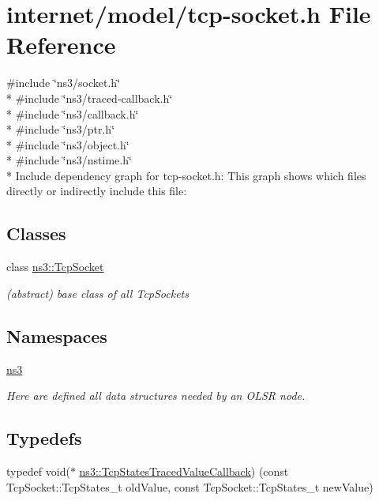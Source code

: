 \hypertarget{tcp-socket_8h}{}\section{internet/model/tcp-\/socket.h File Reference}
\label{tcp-socket_8h}
{\ttfamily \#include \char`\"{}ns3/socket.\+h\char`\"{}}\\*
{\ttfamily \#include \char`\"{}ns3/traced-\/callback.\+h\char`\"{}}\\*
{\ttfamily \#include \char`\"{}ns3/callback.\+h\char`\"{}}\\*
{\ttfamily \#include \char`\"{}ns3/ptr.\+h\char`\"{}}\\*
{\ttfamily \#include \char`\"{}ns3/object.\+h\char`\"{}}\\*
{\ttfamily \#include \char`\"{}ns3/nstime.\+h\char`\"{}}\\*
Include dependency graph for tcp-\/socket.h\+:
This graph shows which files directly or indirectly include this file\+:
\subsection*{Classes}
\begin{DoxyCompactItemize}
\item 
class \hyperlink{classns3_1_1TcpSocket}{ns3\+::\+Tcp\+Socket}
\begin{DoxyCompactList}\small\item\em (abstract) base class of all Tcp\+Sockets \end{DoxyCompactList}\end{DoxyCompactItemize}
\subsection*{Namespaces}
\begin{DoxyCompactItemize}
\item 
 \hyperlink{namespacens3}{ns3}
\begin{DoxyCompactList}\small\item\em Here are defined all data structures needed by an O\+L\+SR node. \end{DoxyCompactList}\end{DoxyCompactItemize}
\subsection*{Typedefs}
\begin{DoxyCompactItemize}
\item 
typedef void($\ast$ \hyperlink{group__tcp_ga2f3674b9fd52fcc3f4ef27a8932424f2}{ns3\+::\+Tcp\+States\+Traced\+Value\+Callback}) (const Tcp\+Socket\+::\+Tcp\+States\+\_\+t old\+Value, const Tcp\+Socket\+::\+Tcp\+States\+\_\+t new\+Value)
\end{DoxyCompactItemize}
